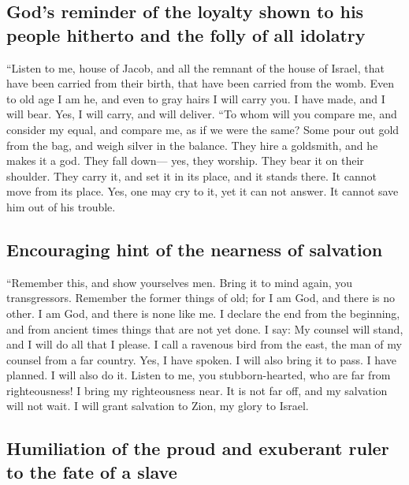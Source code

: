\hypertarget{gods-reminder-of-the-loyalty-shown-to-his-people-hitherto-and-the-folly-of-all-idolatry}{%
\subsection{God's reminder of the loyalty shown to his people hitherto
and the folly of all
idolatry}\label{gods-reminder-of-the-loyalty-shown-to-his-people-hitherto-and-the-folly-of-all-idolatry}}

 ``Listen to me, house of Jacob, and all the remnant of
the house of Israel, that have been carried from their birth, that have
been carried from the womb.  Even to old age I am he, and
even to gray hairs I will carry you. I have made, and I will bear. Yes,
I will carry, and will deliver.  ``To whom will you
compare me, and consider my equal, and compare me, as if we were the
same?  Some pour out gold from the bag, and weigh silver
in the balance. They hire a goldsmith, and he makes it a god. They fall
down--- yes, they worship.  They bear it on their
shoulder. They carry it, and set it in its place, and it stands there.
It cannot move from its place. Yes, one may cry to it, yet it can not
answer. It cannot save him out of his trouble.

\hypertarget{encouraging-hint-of-the-nearness-of-salvation}{%
\subsection{Encouraging hint of the nearness of
salvation}\label{encouraging-hint-of-the-nearness-of-salvation}}

 ``Remember this, and show yourselves men. Bring it to
mind again, you transgressors.  Remember the former things
of old; for I am God, and there is no other. I am God, and there is none
like me.  I declare the end from the beginning, and from
ancient times things that are not yet done. I say: My counsel will
stand, and I will do all that I please.  I call a
ravenous bird from the east, the man of my counsel from a far country.
Yes, I have spoken. I will also bring it to pass. I have planned. I will
also do it.  Listen to me, you stubborn-hearted, who are
far from righteousness!  I bring my righteousness near.
It is not far off, and my salvation will not wait. I will grant
salvation to Zion, my glory to Israel.

\hypertarget{humiliation-of-the-proud-and-exuberant-ruler-to-the-fate-of-a-slave}{%
\subsection{Humiliation of the proud and exuberant ruler to the fate of
a
slave}\label{humiliation-of-the-proud-and-exuberant-ruler-to-the-fate-of-a-slave}}


